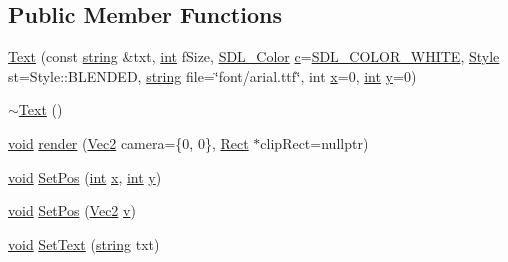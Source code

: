 \subsection*{Public Member Functions}
\begin{DoxyCompactItemize}
\item 
\hyperlink{class_text_a9291762a0deefcb919152c7b66ae448d}{Text} (const \hyperlink{_s_d_l__opengl__glext_8h_ae84541b4f3d8e1ea24ec0f466a8c568b}{string} \&txt, \hyperlink{_s_d_l__thread_8h_a6a64f9be4433e4de6e2f2f548cf3c08e}{int} f\-Size, \hyperlink{struct_s_d_l___color}{S\-D\-L\-\_\-\-Color} \hyperlink{_s_d_l__opengl__glext_8h_a1f2d7f8147412c43ba2303a56f97ee73}{c}=\hyperlink{common_8hpp_a8747c93cef1c9985be8fc426565f466e}{S\-D\-L\-\_\-\-C\-O\-L\-O\-R\-\_\-\-W\-H\-I\-T\-E}, \hyperlink{class_text_ac82ae440952fc1c8e10a16f81a593ce1}{Style} st=Style\-::\-B\-L\-E\-N\-D\-E\-D, \hyperlink{_s_d_l__opengl__glext_8h_ae84541b4f3d8e1ea24ec0f466a8c568b}{string} file=\char`\"{}font/arial.\-ttf\char`\"{}, int \hyperlink{_s_d_l__opengl_8h_ad0e63d0edcdbd3d79554076bf309fd47}{x}=0, \hyperlink{_s_d_l__thread_8h_a6a64f9be4433e4de6e2f2f548cf3c08e}{int} \hyperlink{_s_d_l__opengl_8h_a1675d9d7bb68e1657ff028643b4037e3}{y}=0)
\item 
\hyperlink{class_text_a2d49e5c280e205125b149f7777ae30c7}{$\sim$\-Text} ()
\item 
\hyperlink{_s_d_l__opengles2__gl2ext_8h_ae5d8fa23ad07c48bb609509eae494c95}{void} \hyperlink{class_text_a9eaf3c6d97df6f04451724287cf1b696}{render} (\hyperlink{class_vec2}{Vec2} camera=\{0, 0\}, \hyperlink{class_rect}{Rect} $\ast$clip\-Rect=nullptr)
\item 
\hyperlink{_s_d_l__opengles2__gl2ext_8h_ae5d8fa23ad07c48bb609509eae494c95}{void} \hyperlink{class_text_a54e5a8deab134c5a94c6c3b074655c9f}{Set\-Pos} (\hyperlink{_s_d_l__thread_8h_a6a64f9be4433e4de6e2f2f548cf3c08e}{int} \hyperlink{_s_d_l__opengl_8h_ad0e63d0edcdbd3d79554076bf309fd47}{x}, \hyperlink{_s_d_l__thread_8h_a6a64f9be4433e4de6e2f2f548cf3c08e}{int} \hyperlink{_s_d_l__opengl_8h_a1675d9d7bb68e1657ff028643b4037e3}{y})
\item 
\hyperlink{_s_d_l__opengles2__gl2ext_8h_ae5d8fa23ad07c48bb609509eae494c95}{void} \hyperlink{class_text_a1d03c838f06ed656dde42843cd7b961c}{Set\-Pos} (\hyperlink{class_vec2}{Vec2} \hyperlink{_s_d_l__opengl_8h_a10a82eabcb59d2fcd74acee063775f90}{v})
\item 
\hyperlink{_s_d_l__opengles2__gl2ext_8h_ae5d8fa23ad07c48bb609509eae494c95}{void} \hyperlink{class_text_a300c34a38e7a01c5e5537391d13c1c78}{Set\-Text} (\hyperlink{_s_d_l__opengl__glext_8h_ae84541b4f3d8e1ea24ec0f466a8c568b}{string} txt)

\end{DoxyCompactItemize}
